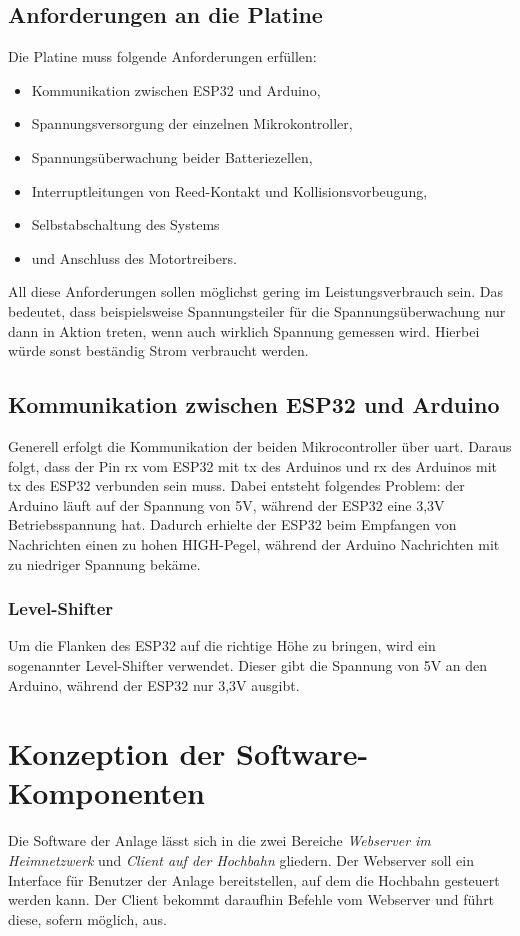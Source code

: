 \section{Anforderungen an die Platine}
Die Platine muss folgende Anforderungen erfüllen: 
\begin{center}
	\begin{itemize}
		\item Kommunikation zwischen ESP32 und Arduino,
		\item Spannungsversorgung der einzelnen Mikrokontroller,
		\item Spannungsüberwachung beider Batteriezellen,
		\item Interruptleitungen von Reed-Kontakt und Kollisionsvorbeugung,
		\item Selbstabschaltung des Systems
		\item und Anschluss des Motortreibers.
	\end{itemize}
\end{center}
All diese Anforderungen sollen möglichst gering im Leistungsverbrauch sein. Das bedeutet, dass beispielsweise Spannungsteiler für die Spannungsüberwachung nur dann in Aktion treten, wenn auch wirklich Spannung gemessen wird. Hierbei würde sonst beständig Strom verbraucht werden.

\section{Kommunikation zwischen ESP32 und Arduino}
Generell erfolgt die Kommunikation der beiden Mikrocontroller über \acrshort{uart}. Daraus folgt, dass der Pin \acrfull{rx} vom ESP32 mit \acrfull{tx} des Arduinos und \acrshort{rx} des Arduinos mit \acrshort{tx} des ESP32 verbunden sein muss. 
Dabei entsteht folgendes Problem: der Arduino läuft auf der Spannung von 5V, während der ESP32 eine 3,3V Betriebsspannung hat. Dadurch erhielte der ESP32 beim Empfangen von Nachrichten einen zu hohen HIGH-Pegel, während der Arduino Nachrichten mit zu niedriger Spannung bekäme.

\subsection{Level-Shifter}
Um die Flanken des ESP32 auf die richtige Höhe zu bringen, wird ein sogenannter Level-Shifter verwendet. Dieser gibt die Spannung von 5V an den Arduino, während der ESP32 nur 3,3V ausgibt.


\chapter{Konzeption der Software-Komponenten}
\label{sec:software}
Die Software der Anlage lässt sich in die zwei Bereiche \textit{Webserver im Heimnetzwerk} und \textit{Client auf der Hochbahn} gliedern. Der Webserver soll ein Interface für Benutzer der Anlage bereitstellen, auf dem die Hochbahn gesteuert werden kann. 
Der Client bekommt daraufhin Befehle vom Webserver und führt diese, sofern möglich, aus. 

